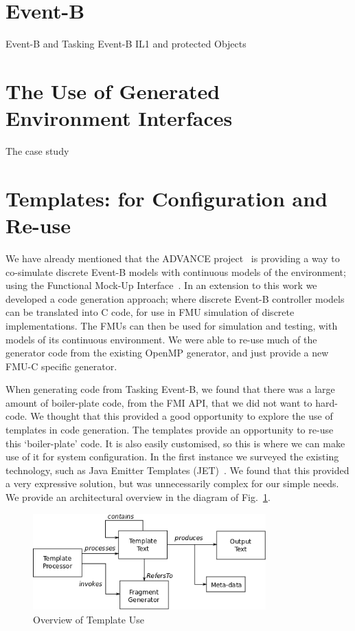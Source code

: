 \documentclass{llncs}%
\begin{document}
%
\section{Event-B }
%
Event-B and Tasking Event-B
%
IL1 and protected Objects
%
\section{The Use of Generated Environment Interfaces}\label{interfaces}
%
%
The case study
%
%
%
\section{Templates: for Configuration and Re-use}\label{templates}
%
We have already mentioned that the ADVANCE project~\cite{advance} is providing a way to co-simulate discrete Event-B models with continuous models of the environment; using the Functional Mock-Up Interface~\cite{FMISTD}. In an extension to this work we developed a code generation approach; where discrete Event-B controller models can be translated into C code, for use in FMU simulation of discrete implementations. The FMUs can then be used for simulation and testing, with models of its continuous environment. We were able to re-use much of the generator code from the existing OpenMP generator, and just provide a new FMU-C specific generator.  

When generating code from Tasking Event-B, we found that there was a large amount of boiler-plate code, from the FMI API, that we did not want to hard-code. We thought that this provided a good opportunity to explore the use of templates in code generation. The templates provide an opportunity to re-use this `boiler-plate' code. It is also easily customised, so this is where we can make use of it for system configuration. In the first instance we surveyed the existing technology, such as Java Emitter Templates (JET)~\cite{JET}. We found that this provided a very expressive solution, but was unnecessarily complex for our simple needs. We provide an architectural overview in the diagram of Fig.~\ref{fig:templates}.
%
\begin{figure}
\centering
\includegraphics[width=0.8\textwidth]{templateOverview.png}
\caption{Overview of Template Use}
\label{fig:templates}
\end{figure}
%
\end{document}
